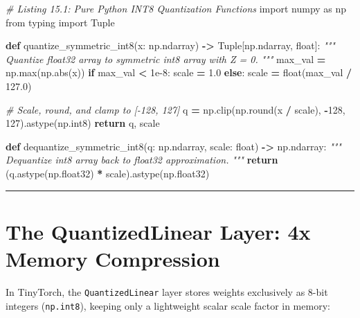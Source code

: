 \documentclass[
  letterpaper,
]{scrbook}
\newenvironment{Shaded}{\begin{snugshade}}{\end{snugshade}}
\newcommand{\BuiltInTok}[1]{#1}
\newcommand{\CommentTok}[1]{\textcolor[rgb]{0.56,0.35,0.01}{\textit{#1}}}
\newcommand{\ControlFlowTok}[1]{\textcolor[rgb]{0.13,0.29,0.53}{\textbf{#1}}}
\newcommand{\DecValTok}[1]{\textcolor[rgb]{0.00,0.00,0.81}{#1}}
\newcommand{\FloatTok}[1]{\textcolor[rgb]{0.00,0.00,0.81}{#1}}
\newcommand{\ImportTok}[1]{#1}
\newcommand{\KeywordTok}[1]{\textcolor[rgb]{0.13,0.29,0.53}{\textbf{#1}}}
\newcommand{\NormalTok}[1]{#1}
\newcommand{\OperatorTok}[1]{\textcolor[rgb]{0.81,0.36,0.00}{\textbf{#1}}}
\begin{document}
\begin{Shaded}
\begin{Highlighting}[]
\CommentTok{\# Listing 15.1: Pure Python INT8 Quantization Functions}
\ImportTok{import}\NormalTok{ numpy }\ImportTok{as}\NormalTok{ np}
\ImportTok{from}\NormalTok{ typing }\ImportTok{import}\NormalTok{ Tuple}

\KeywordTok{def}\NormalTok{ quantize\_symmetric\_int8(x: np.ndarray) }\OperatorTok{{-}\textgreater{}}\NormalTok{ Tuple[np.ndarray, }\BuiltInTok{float}\NormalTok{]:}
    \CommentTok{"""}
\CommentTok{    Quantize float32 array to symmetric int8 array with Z = 0.}
\CommentTok{    """}
\NormalTok{    max\_val }\OperatorTok{=}\NormalTok{ np.}\BuiltInTok{max}\NormalTok{(np.}\BuiltInTok{abs}\NormalTok{(x))}
    \ControlFlowTok{if}\NormalTok{ max\_val }\OperatorTok{\textless{}} \FloatTok{1e{-}8}\NormalTok{:}
\NormalTok{        scale }\OperatorTok{=} \FloatTok{1.0}
    \ControlFlowTok{else}\NormalTok{:}
\NormalTok{        scale }\OperatorTok{=} \BuiltInTok{float}\NormalTok{(max\_val }\OperatorTok{/} \FloatTok{127.0}\NormalTok{)}

    \CommentTok{\# Scale, round, and clamp to [{-}128, 127]}
\NormalTok{    q }\OperatorTok{=}\NormalTok{ np.clip(np.}\BuiltInTok{round}\NormalTok{(x }\OperatorTok{/}\NormalTok{ scale), }\OperatorTok{{-}}\DecValTok{128}\NormalTok{, }\DecValTok{127}\NormalTok{).astype(np.int8)}
    \ControlFlowTok{return}\NormalTok{ q, scale}

\KeywordTok{def}\NormalTok{ dequantize\_symmetric\_int8(q: np.ndarray, scale: }\BuiltInTok{float}\NormalTok{) }\OperatorTok{{-}\textgreater{}}\NormalTok{ np.ndarray:}
    \CommentTok{"""}
\CommentTok{    Dequantize int8 array back to float32 approximation.}
\CommentTok{    """}
    \ControlFlowTok{return}\NormalTok{ (q.astype(np.float32) }\OperatorTok{*}\NormalTok{ scale).astype(np.float32)}
\end{Highlighting}
\end{Shaded}

\begin{center}\rule{0.5\linewidth}{0.5pt}\end{center}

\section{The QuantizedLinear Layer: 4x Memory
Compression}\label{the-quantizedlinear-layer-4x-memory-compression}

In TinyTorch, the \texttt{QuantizedLinear} layer stores weights
exclusively as 8-bit integers (\texttt{np.int8}), keeping only a
lightweight scalar scale factor in memory:
\end{document}
